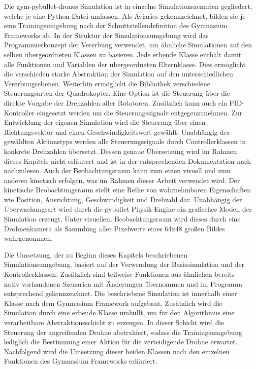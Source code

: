 Die gym-pybullet-drones Simulation ist in einzelne Simulationszenarien gegliedert, welche je eine Python Datei umfassen.
Als Aviaries gekennzeichnet, bilden sie je eine Trainingsumgebung nach der Schnittstellendefinition des Gymnasium Frameworks ab.
In der Struktur der Simulationsumgebung wird das Programmierkonzept der Vererbung verwendet, um ähnliche Simulationen auf den selben übergeordneten Klassen zu basieren.
Jede erbende Klasse enthält damit alle Funktionen und Variablen der übergeordneten Elternklasse.
Dies ermöglicht die verschieden starke Abstraktion der Simulation auf den unterschiedlichen Vererbungsebenen.
Weiterhin ermöglicht die Bibliothek verschiedene Steuerungsarten der Quadrokopter. 
Eine Option ist die Steuerung über die direkte Vorgabe der Drehzahlen aller Rotatoren. 
Zusätzlich kann auch ein PID-Kontroller eingesetzt werden um die Steuerungssignale entgegenzunehmen.
Zur Entwicklung der eigenen Simulation wird die Steuerung über einen Richtungsvektor und einen Geschwindigkeitswert gewählt.
Unabhängig des gewählten Aktionstyps werden alle Steuerungssignale durch Controllerklassen in konkrete Drehzahlen übersetzt.
Dessen genaue Übersetzung wird im Rahmen dieses Kapitels nicht erläutert und ist in der entsprechenden Dokumentation nach \cite[]{Panerati.332021} nachzulesen.
Auch der Beobachtungsraum kann zum einen visuell und zum anderen kinetisch erfolgen, was im Rahmen dieser Arbeit verwendet wird.
Der kinetische Beobachtungsraum stellt eine Reihe von wahrnehmbaren Eigenschaften wie Position, Ausrichtung, Geschwindigkeit und Drehzahl dar.
Unabhängig der Überwachungsart wird durch die pybullet Physik-Engine ein grafisches Modell der Simulation erzeugt.
Unter visuellem Beobachtungsraum wird dieses durch eine Drohnenkamera als Sammlung aller Pixelwerte eines 64x48 großen Bildes wahrgenommen.

Die Umsetzung, der zu Beginn dieses Kapitels beschriebenen Simulationsumgebung, basiert auf der Verwendung der Basissimulation und der Kontrollerklassen. 
Zusätzlich sind teilweise Funktionen aus ähnlichen bereits nativ vorhandenen Szenarien mit Änderungen übernommen und im Programm entsprechend gekennzeichnet.
Die beschriebene Simulation ist innerhalb einer Klasse nach dem Gymnasium Framework aufgebaut.
Zusätzlich wird die Simulation durch eine erbende Klasse umhüllt, um für den Algorithmus eine verarbeitbare Abstraktionsschicht zu erzeugen.
In dieser Schicht wird die Steuerung der angreifenden Drohne abstrahiert, sodass die Trainingsumgebung lediglich die Bestimmung einer Aktion für die verteidigende Drohne erwartet.
Nachfolgend wird die Umsetzung dieser beiden Klassen nach den einzelnen Funktionen des Gymnasium Frameworks erläutert.

